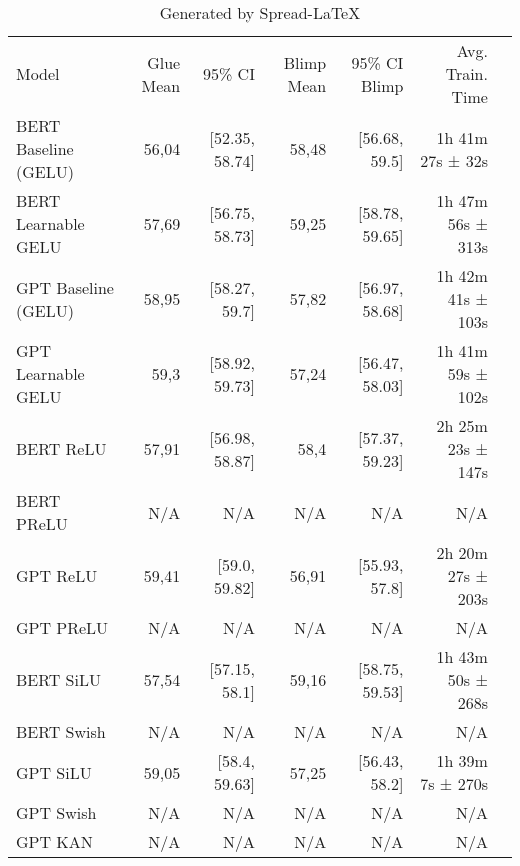 \begin{table*}[!htp]\centering
    \caption{Generated by Spread-LaTeX}\label{tab: }
    \scriptsize
    \begin{tabular}{lrrrrrr}\toprule
    Model &Glue Mean &95\% CI &Blimp Mean &95\% CI Blimp &Avg. Train. Time \\\cmidrule{1-6}
    BERT Baseline (GELU) &56,04 &[52.35, 58.74] &58,48 &[56.68, 59.5] &1h 41m 27s ± 32s \\\cmidrule{1-6}
    BERT Learnable GELU &57,69 &[56.75, 58.73] &59,25 &[58.78, 59.65] &1h 47m 56s ± 313s \\\cmidrule{1-6}
    GPT Baseline (GELU) &58,95 &[58.27, 59.7] &57,82 &[56.97, 58.68] &1h 42m 41s ± 103s \\\cmidrule{1-6}
    GPT Learnable GELU &59,3 &[58.92, 59.73] &57,24 &[56.47, 58.03] &1h 41m 59s ± 102s \\\cmidrule{1-6}
    BERT ReLU &57,91 &[56.98, 58.87] &58,4 &[57.37, 59.23] &2h 25m 23s ± 147s \\\midrule
    BERT PReLU &N/A &N/A &N/A &N/A &N/A \\
    GPT ReLU &59,41 &[59.0, 59.82] &56,91 &[55.93, 57.8] &2h 20m 27s ± 203s \\
    GPT PReLU &N/A &N/A &N/A &N/A &N/A \\
    BERT SiLU &57,54 &[57.15, 58.1] &59,16 &[58.75, 59.53] &1h 43m 50s ± 268s \\
    BERT Swish &N/A &N/A &N/A &N/A &N/A \\
    GPT SiLU &59,05 &[58.4, 59.63] &57,25 &[56.43, 58.2] &1h 39m 7s ± 270s \\
    GPT Swish &N/A &N/A &N/A &N/A &N/A \\
    GPT KAN &N/A &N/A &N/A &N/A &N/A \\
    \bottomrule
    \end{tabular}
    \end{table*}
\newpage